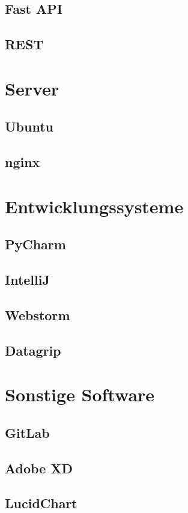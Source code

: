 \documentclass[pdftex,11pt,a4paper]{book}
\begin{document}
\subsection{Fast API}
\subsection{REST}

\section{Server}
\subsection{Ubuntu}
\subsection{nginx}

\section{Entwicklungssysteme}
\subsection{PyCharm}
\subsection{IntelliJ}
\subsection{Webstorm}
\subsection{Datagrip}
\section{Sonstige Software}
\subsection{GitLab}
\subsection{Adobe XD}
\subsection{LucidChart}
\end{document}
